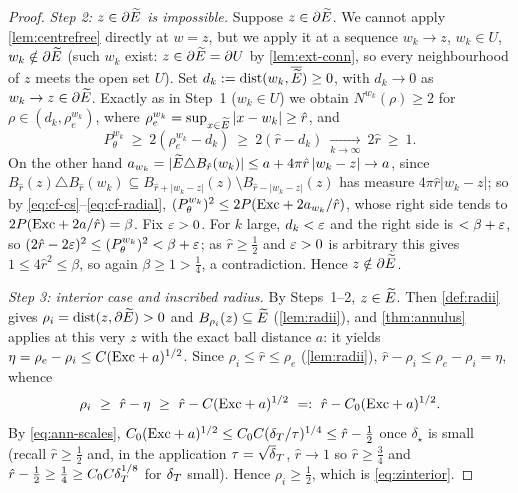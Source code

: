 \begin{proof}
\emph{Step 2: $z\in\partial\widetilde{E}$ is impossible.} Suppose $z\in\partial\widetilde{E}$.
We cannot apply \cref{lem:centrefree} directly at $w=z$, but we apply it at a
sequence $w_k\to z$, $w_k\in U$, $w_k\notin\partial\widetilde{E}$ (such $w_k$ exist:
$z\in\partial\widetilde{E}=\partial U$ by \cref{lem:ext-conn}, so every neighbourhood
of $z$ meets the open set $U$). Set $d_k:=\operatorname{dist}(w_k,\overline{\widetilde{E}})\ge0$, with
$d_k\to0$ as $w_k\to z\in\partial\widetilde{E}$. Exactly as in Step~1
\textup{(}$w_k\in U$\textup{)} we obtain $N^{w_k}(\rho)\ge2$ for $\rho\in
(d_k,\rho_e^{w_k})$, where $\rho_e^{w_k}=\sup_{x\in\widetilde{E}}|x-w_k|\ge\hat r$, and
\[
   P_\theta^{w_k}\ \ge\ 2(\rho_e^{w_k}-d_k)\ \ge\ 2(\hat r-d_k)\
   \xrightarrow[k\to\infty]{}\ 2\hat r\ \ge\ 1 .
\]
On the other hand $a_{w_k}=|\widetilde{E}\triangle B_{\hat r}(w_k)|\le a+4\pi\hat r\,
|w_k-z|\to a$, since $B_{\hat r}(z)\triangle B_{\hat r}(w_k)\subseteq
B_{\hat r+|w_k-z|}(z)\setminus B_{\hat r-|w_k-z|}(z)$ has measure
$4\pi\hat r|w_k-z|$; so by \eqref{eq:cf-cs}--\eqref{eq:cf-radial},
$(P_\theta^{w_k})^2\le2P(\mathrm{Exc}+2a_{w_k}/\hat r)$, whose right side tends to
$2P(\mathrm{Exc}+2a/\hat r)=\beta$. Fix $\varepsilon>0$. For $k$ large, $d_k<\varepsilon$ and the
right side is $<\beta+\varepsilon$, so $(2\hat r-2\varepsilon)^2\le(P_\theta^{w_k})^2<
\beta+\varepsilon$; as $\hat r\ge\tfrac12$ and $\varepsilon>0$ is arbitrary this gives
$1\le4\hat r^2\le\beta$, so again $\beta\ge1>\tfrac14$, a contradiction.
Hence $z\notin\partial\widetilde{E}$.

\emph{Step 3: interior case and inscribed radius.} By Steps~1--2, $z\in\widetilde{E}$.
Then \cref{def:radii} gives $\rho_i=\operatorname{dist}(z,\partial\widetilde{E})>0$ and
$B_{\rho_i}(z)\subseteq\widetilde{E}$ (\cref{lem:radii}), and \cref{thm:annulus}
applies at this very $z$ with the exact ball distance $a$: it yields
$\eta=\rho_e-\rho_i\le C(\mathrm{Exc}+a)^{1/2}$. Since $\rho_i\le\hat r\le\rho_e$
(\cref{lem:radii}), $\hat r-\rho_i\le\rho_e-\rho_i=\eta$, whence
\[
   \rho_i\ \ge\ \hat r-\eta\ \ge\ \hat r-C(\mathrm{Exc}+a)^{1/2}\ =:\
   \hat r-C_0(\mathrm{Exc}+a)^{1/2}.
\]
By \eqref{eq:ann-scales}, $C_0(\mathrm{Exc}+a)^{1/2}\le C_0C(\delta_T/\tau)^{1/4}\le
\hat r-\tfrac12$ once $\delta_\star$ is small (recall $\hat r\ge\tfrac12$ and,
in the application $\tau=\sqrt\dT$, $\hat r\to1$ so $\hat r\ge\tfrac34$ and
$\hat r-\tfrac12\ge\tfrac14\ge C_0C\delta_T^{1/8}$ for $\delta_T$ small). Hence
$\rho_i\ge\tfrac12$, which is \eqref{eq:zinterior}.
\end{proof}

